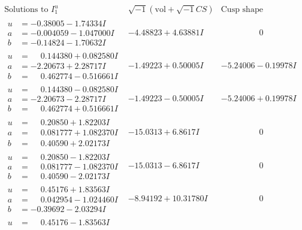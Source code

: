 \documentclass[1p]{elsarticle_modified}
\theoremstyle{definition}
\newcommand{\I}{\sqrt{-1}}
\begin{document}
$$\begin{array}{c|c|c}
\text{Solutions to }I^u_{1}& \I (\text{vol} + \sqrt{-1}CS) & \text{Cusp shape}\\
 \hline 
\begin{aligned}
u &= -0.38005 - 1.74334 I \\
a &= -0.004059 - 1.047000 I \\
b &= -0.14824 - 1.70632 I\end{aligned}
 & -4.48823 + 4.63881 I & \phantom{-0.000000 } 0 \\ \hline\begin{aligned}
u &= \phantom{-}0.144380 + 0.082580 I \\
a &= -2.20673 + 2.28717 I \\
b &= \phantom{-}0.462774 - 0.516661 I\end{aligned}
 & -1.49223 + 0.50005 I & -5.24006 - 0.19978 I \\ \hline\begin{aligned}
u &= \phantom{-}0.144380 - 0.082580 I \\
a &= -2.20673 - 2.28717 I \\
b &= \phantom{-}0.462774 + 0.516661 I\end{aligned}
 & -1.49223 - 0.50005 I & -5.24006 + 0.19978 I \\ \hline\begin{aligned}
u &= \phantom{-}0.20850 + 1.82203 I \\
a &= \phantom{-}0.081777 + 1.082370 I \\
b &= \phantom{-}0.40590 + 2.02173 I\end{aligned}
 & -15.0313 + 6.8617 I & \phantom{-0.000000 } 0 \\ \hline\begin{aligned}
u &= \phantom{-}0.20850 - 1.82203 I \\
a &= \phantom{-}0.081777 - 1.082370 I \\
b &= \phantom{-}0.40590 - 2.02173 I\end{aligned}
 & -15.0313 - 6.8617 I & \phantom{-0.000000 } 0 \\ \hline\begin{aligned}
u &= \phantom{-}0.45176 + 1.83563 I \\
a &= \phantom{-}0.042954 - 1.024460 I \\
b &= -0.39692 - 2.03294 I\end{aligned}
 & -8.94192 + 10.31780 I & \phantom{-0.000000 } 0 \\ \hline\begin{aligned}
u &= \phantom{-}0.45176 - 1.83563 I \\

\end{aligned}
\end{array}$$
\end{document}

